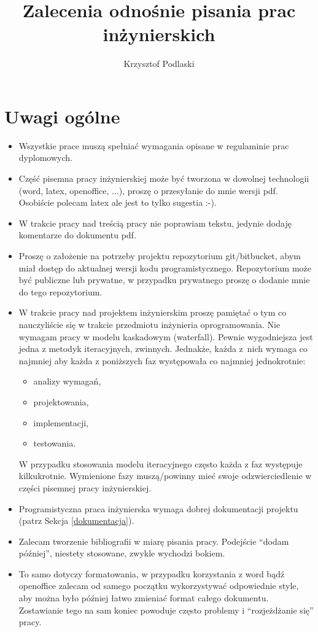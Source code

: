 \documentclass[12pt,a4paper]{article}
\begin{document}
\title{Zalecenia odnośnie pisania prac inżynierskich}
\author{Krzysztof Podlaski}
\date{}
\maketitle


\section{Uwagi ogólne}
\begin{itemize}
\item Wszystkie prace muszą spełniać wymagania opisane w regulaminie prac dyplomowych.
\item Część pisemna pracy inżynierskiej może być tworzona w dowolnej technologii (word, latex, openoffice, ...), proszę o przesyłanie do mnie wersji pdf. Osobiście polecam latex ale jest to tylko sugestia :-).
\item W trakcie pracy nad treścią pracy nie poprawiam tekstu, jedynie dodaję komentarze do dokumentu pdf.
\item Proszę o założenie na potrzeby projektu repozytorium git/bitbucket, abym miał dostęp do aktualnej wersji kodu programistycznego.  Repozytorium może być publiczne lub prywatne, w przypadku prywatnego proszę o dodanie mnie do tego repozytorium.
\item W trakcie pracy nad projektem inżynierskim proszę pamiętać o tym co nauczyliście się w trakcie przedmiotu inżynieria oprogramowania. Nie wymagam pracy w modelu kaskadowym (waterfall). Pewnie wygodniejsza jest jedna z metodyk iteracyjnych, zwinnych. Jednakże, każda z~nich wymaga co najmniej aby każda z poniższych faz występowała co najmniej jednokrotnie:
    \begin{itemize}
    \item analizy wymagań,
    \item projektowania,
    \item implementacji,
    \item testowania.
    \end{itemize}
    W przypadku stosowania modelu iteracyjnego często każda z faz występuje kilkukrotnie. Wymienione fazy muszą/powinny mieć swoje odzwierciedlenie w części pisemnej pracy inżynierskiej.
\item Programistyczna praca inżynierska wymaga dobrej dokumentacji projektu (patrz Sekcja \ref{dokumentacja}).
\item Zalecam tworzenie bibliografii w miarę pisania pracy. Podejście ``dodam później'', niestety stosowane, zwykle wychodzi bokiem.
\item To samo dotyczy formatowania, w przypadku korzystania z word bądź openoffice zalecam od samego początku wykorzystywać odpowiednie style, aby można było później łatwo zmieniać format całego dokumentu. Zostawianie tego na sam koniec powoduje często problemy i ``rozjeżdżanie się'' pracy.
\end{itemize}
\end{document}
